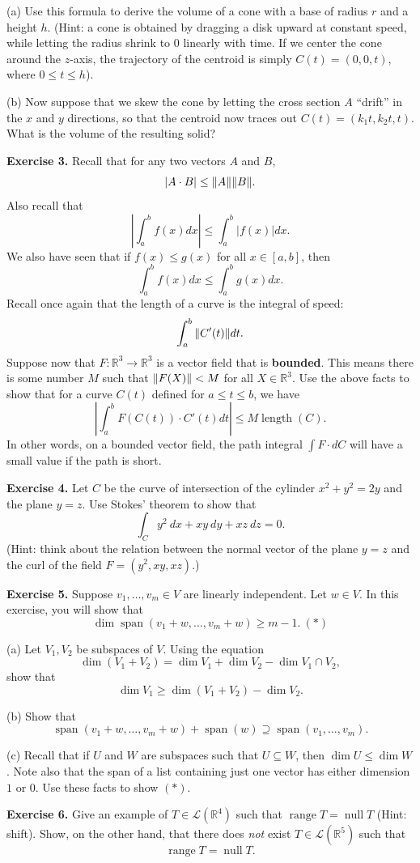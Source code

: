 \documentclass{article}
\DeclareMathOperator{\length}{length}
\DeclareMathOperator{\vspan}{span}
\DeclareMathOperator{\rng}{range}
\DeclareMathOperator{\nul}{null}
\begin{document}
(a) Use this formula to derive the volume of a cone with a base of radius $r$ and
a height $h$. (Hint: a cone is obtained by dragging a disk upward at constant speed, while letting
the radius shrink to $0$ linearly with time. If we center the cone around the $z$-axis, the trajectory of the 
centroid is simply $C(t) = (0,0,t)$, where $0 \leq t \leq h$).

(b) Now suppose that we skew the cone by letting the cross section $A$ ``drift'' in the $x$ and $y$
directions, so that the centroid now traces out $C(t) = (k_1 t, k_2 t, t)$. What is the volume of the
resulting solid?

\newpage
\textbf{Exercise 3.} Recall that for any two vectors $A$ and $B$,
\[|A \cdot B| \leq \norm{A} \norm{B}.\] 
Also recall that 
\[\left| \int_a^b f(x)dx  \right| \leq \int_a^b |f(x)|dx.\]
We also have seen that if $f(x) \leq g(x)$ for all $x \in [a,b]$, then \[\int_a^b f(x)dx \leq \int_a^b g(x)dx.\]
Recall once again that the length of a curve is the integral of speed:
\[\int_{a}^{b} \norm{C'(t)} dt.\]
Suppose now that $F: \mathbb{R}^3 \to \mathbb{R}^3$ is a vector field that is \textbf{bounded}. This means there is some
number $M$ such that
$\norm{F(X)} < M$ for all $X \in \mathbb{R}^3$. Use the above facts to show that for a curve $C(t)$ defined 
for $a \leq t \leq b$, we have
\[\left| \int_a^b F(C(t))\cdot C'(t)dt \right| \leq M \length(C).\]
In other words, on a bounded vector field, the path integral $\int F \cdot dC$ will have a small value
if the path is short.

\newpage
\textbf{Exercise 4.} Let $C$ be the curve of intersection of the cylinder 
$x^2+y^2 = 2y$ and the plane $y=z$. Use Stokes' theorem to show that
\[\int_C y^2\ dx + xy\ dy + xz\ dz = 0.\]
(Hint: think about the relation between the normal vector of the plane $y=z$ and the curl of the field $F=(y^2,xy,xz)$.)

\newpage
\textbf{Exercise 5.} Suppose $v_1, \ldots, v_m \in V$ are linearly independent. Let $w \in V$. In this exercise, you will show that
\[\dim \vspan (v_1 + w, \ldots, v_m + w) \geq m-1.\ (*)\]

(a) Let $V_1, V_2$ be subspaces of $V$. Using the equation 
\[\dim (V_1 + V_2) = \dim V_1 + \dim V_2 - \dim V_1 \cap V_2,\]
show that
\[\dim V_1 \geq \dim(V_1 + V_2) - \dim V_2.\]

(b) Show that
\[\vspan(v_1+w, \ldots, v_m + w) + \vspan(w) \supseteq \vspan(v_1, \ldots, v_m).\]

(c) Recall that if $U$ and $W$ are subspaces such that $U \subseteq W$, then $\dim U \leq \dim W$.
Note also that the span of a list containing just one vector has either dimension $1$ or $0$. Use these facts
to show $(*)$.

\newpage
\textbf{Exercise 6.} Give an example of $T \in \mathcal{L}(\mathbb{R}^4)$
such that $\rng T = \nul T$ (Hint: shift).
Show, on the other hand, that there does \emph{not} exist $T \in \mathcal{L}(\mathbb{R}^5)$
such that 
\[\rng T = \nul T.\]
\end{document}
